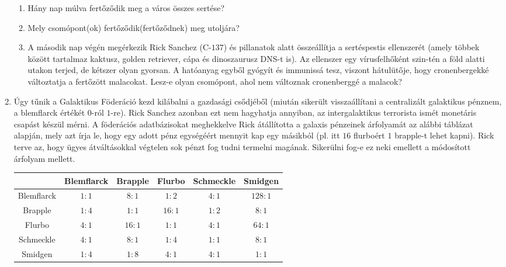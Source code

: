 \documentclass[a4paper,12pt]{article}
\begin{document}
\begin{enumerate}
        \begin{minipage}{0.6\textwidth}
            \begin{enumerate}
                \item Hány nap múlva fertőződik meg a város összes sertése?
                \item Mely csomópont(ok) fertőződik(fertőződnek) meg utoljára?
                \item A második nap végén megérkezik Rick Sanchez (C-$137$) és pillanatok alatt összeállítja a sertéspestis ellenszerét (amely többek között tartalmaz kaktusz, golden retriever, cápa és dinoszaurusz DNS-t is). Az ellenszer egy vírusfelhőként szin-tén a föld alatti utakon terjed, de kétszer olyan gyorsan. A hatóanyag egyből gyógyít és immunissá tesz, viszont hátulütője, hogy cronenbergekké változtatja a fertőzött malacokat. Lesz-e olyan csomópont, ahol nem változnak cronenberggé a malacok?
            \end{enumerate}
        \end{minipage}
        \begin{minipage}{0.3\textwidth}
            \centering
            
        \end{minipage}

        \item Úgy tűnik a Galaktikus Föderáció kezd kilábalni a gazdasági csődjéből (miután sikerült visszaállítani a centralizált galaktikus pénznem, a blemflarck értékét $0$-ról $1$-re). Rick Sanchez azonban ezt nem hagyhatja annyiban, az intergalaktikus terrorista ismét monetáris csapást készül mérni. A föderációs adatbázisokat meghekkelve Rick átállította a galaxis pénzeinek árfolyamát az alábbi táblázat alapján, mely azt írja le, hogy egy adott pénz egységéért mennyit kap egy másikból (pl. itt $16$ flurboért $1$ brapple-t lehet kapni). Rick terve az, hogy ügyes átváltásokkal végtelen sok pénzt fog tudni termelni magának. Sikerülni fog-e ez neki emellett a módosított árfolyam mellett.

        \begin{table}[h]
            \centering
            \begin{tabular}{|c|c|c|c|c|c|}
                \hline
                    & Blemflarck & Brapple & Flurbo & Schmeckle & Smidgen \\ \hline
                Blemflarck & $1:1$ & $8:1$ & $1:2$ & $4:1$ & $128:1$ \\ \hline
                Brapple & $1:4$ & $1:1$ & $16:1$ & $1:2$ & $8:1$ \\ \hline
                Flurbo & $4:1$ & $16:1$ & $1:1$ & $4:1$ & $64:1$ \\ \hline
                Schmeckle & $4:1$ & $8:1$ & $1:4$ & $1:1$ & $8:1$ \\ \hline
                Smidgen & $1:4$ & $1:8$ & $4:1$ & $4:1$ & $1:1$ \\ \hline

            \end{tabular}
        \end{table}
    \end{enumerate}
\end{document}
